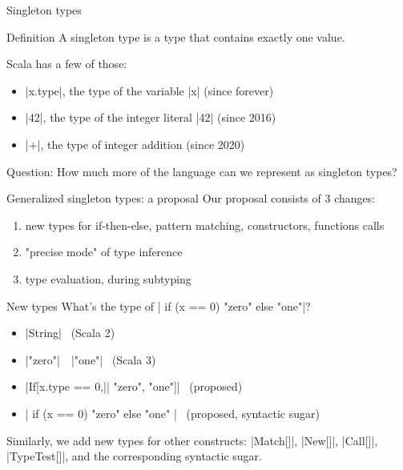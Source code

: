 \documentclass[10pt]{beamer}
\newenvironment{slide}[2][]
  {\begin{frame}[fragile,environment=slide,#1]{#2}}
  {\end{frame}}
\begin{document}
\begin{slide}{Singleton types}
\begin{block}{Definition}
A singleton type is a type that contains exactly one value.
\end{block}

\pause

Scala has a few of those:
\begin{itemize}
  \item |x.type|, the type of the variable |x| (since forever)
  \item |42|, the type of the integer literal |42| (since 2016)
  \item |+|, the type of integer addition (since 2020)
\end{itemize}
\pause
Question: How much more of the language can we represent as singleton types?
\end{slide}

\begin{slide}{Generalized singleton types: a proposal}
Our proposal consists of 3 changes:
\begin{enumerate}
  \item new types for if-then-else, pattern matching, constructors, functions calls
  \item "precise mode" of type inference
  \item type evaluation, during subtyping
\end{enumerate}
\end{slide}

\begin{slide}{New types}
What's the type of | if (x == 0) "zero" else "one"|?
\begin{itemize}
  \pause\item |String| ~(Scala 2)
  \pause\item |"zero"|~{\footnotesize\texttt\textbar}~|"one"| ~(Scala 3)
  \pause\item |If[x.type == 0,|| "zero", "one"]| ~(proposed)
  \pause\item |{ if (x == 0) "zero" else "one" }| ~(proposed, syntactic sugar)
\end{itemize}
\pause
Similarly, we add new types for other constructs: |Match[]|, |New[]|, |Call[]|, |TypeTest[]|, and the corresponding syntactic sugar.
\end{slide}
\end{document}
